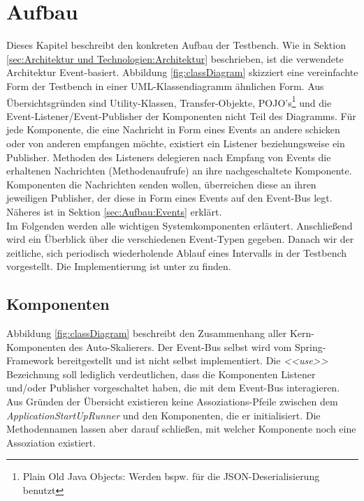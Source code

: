 \chapter{Aufbau}
\label{ch:Aufbau}
Dieses Kapitel beschreibt den konkreten Aufbau der Testbench. Wie in Sektion \ref{sec:Architektur und Technologien:Architektur} beschrieben, ist die verwendete Architektur Event-basiert. Abbildung \ref{fig:classDiagram} skizziert eine vereinfachte Form der Testbench in einer UML-Klassendiagramm ähnlichen Form. Aus Übersichtsgründen sind Utility-Klassen, Transfer-Objekte, POJO's\footnote{Plain Old Java Objects: Werden bspw. für die JSON-Deserialisierung benutzt} und die Event-Listener/Event-Publisher der Komponenten nicht Teil des Diagramms. Für jede Komponente, die eine Nachricht in Form eines Events an andere schicken oder von anderen empfangen möchte, existiert ein Listener beziehungsweise ein Publisher. Methoden des Listeners delegieren nach Empfang von Events die erhaltenen Nachrichten (Methodenaufrufe) an ihre nachgeschaltete Komponente. Komponenten die Nachrichten senden wollen, überreichen diese an ihren jeweiligen Publisher, der diese in Form eines Events auf den Event-Bus legt. Näheres ist in Sektion \ref{sec:Aufbau:Events} erklärt. \\
Im Folgenden werden alle wichtigen Systemkomponenten erläutert. Anschließend wird ein Überblick über die verschiedenen Event-Typen gegeben. Danach wir der zeitliche, sich periodisch wiederholende Ablauf eines Intervalls in der Testbench vorgestellt. Die Implementierung ist unter \cite{github} zu finden.









\section{Komponenten}
Abbildung \ref{fig:classDiagram} beschreibt den Zusammenhang aller Kern-Komponenten des Auto-Skalierers. Der Event-Bus selbst wird vom Spring-Framework bereitgestellt und ist nicht selbst implementiert. Die \textit{<<use>>} Bezeichnung soll lediglich verdeutlichen, dass die Komponenten Listener und/oder Publisher vorgeschaltet haben, die mit dem Event-Bus interagieren. Aus Gründen der Übersicht existieren keine Assoziations-Pfeile zwischen dem \textit{ApplicationStartUpRunner} und den Komponenten, die er initialisiert. Die Methodennamen lassen aber darauf schließen, mit welcher Komponente noch eine Assoziation existiert.

